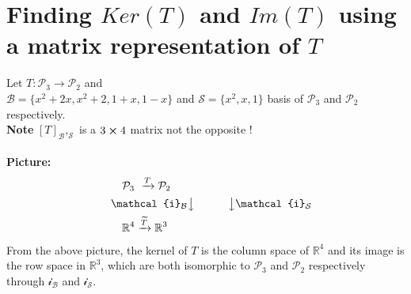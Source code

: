 \documentclass[
12pt,
]{article}
\theoremstyle{definition}
\theoremstyle{definition}
\theoremstyle{definition}
\theoremstyle{definition}
\begin{document}
\section{Finding $Ker(T)$ and $Im(T)$ using a matrix representation of $T$}
Let $T : \mathcal{P}_3 \xrightarrow{} \mathcal{P}_2$ and \\
$\mathcal{B} = \{x^2+2x, x^2+2, 1+x, 1-x \}$ and $ \mathcal{S} = \{x^2,x,1\} $ basis of $\mathcal{P}_3$ and $\mathcal{P}_2$ respectively. \\ 
\textbf{Note} $[T]_\mathcal{B}{},_\mathcal{S}$ is a $3\cross 4$ matrix not the opposite !\\ \\
\textbf{Picture: }
\begin{align*}
&\quad\quad \mathcal{P}_3 \text{  }\xrightarrow{T} \mathcal{P}_2\\
&\quad \mathcal{i}_{\mathcal{B}}\big\downarrow\quad\quad\quad \big\downarrow\mathcal{i}_\mathcal{S} \\
&\quad\quad \mathbb{R}^{4} \xrightarrow{\widetilde{T}} \mathbb{R}^{3}
\end{align*}
From the above picture, the kernel of $T$ is the column space of $\mathbb{R}^4$ and its image is the row space in $\mathbb{R}^3$, which are both isomorphic to $\mathcal{P}_3$ and $\mathcal{P}_2$ respectively through $\mathcal{i}_{\mathcal{B}}$ and $\mathcal{i}_{\mathcal{S}}$.\\
\end{document}
